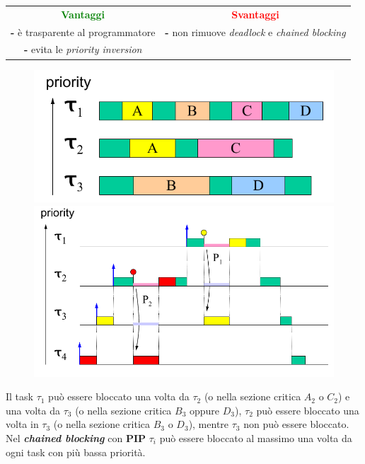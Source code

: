 \begin{center}
    \begin{tabular}{ c | c }
        \textcolor{green}{\textbf{Vantaggi}} & \textcolor{red}{\textbf{Svantaggi}} \\
        \textbf{-} è trasparente al programmatore & \textbf{-} non rimuove \textit{deadlock} e \textit{chained blocking} \\
        \textbf{-} evita le \textit{priority inversion} &  \\
    \end{tabular}
\end{center}
\begin{figure}[h]
    \centering
    \begin{minipage}[t]{0.45\textwidth}
        \centering
        \includegraphics[width=\textwidth]{img/pip_2}
    \end{minipage}
    \begin{minipage}[t]{0.45\textwidth}
        \centering
        \includegraphics[width=\textwidth]{img/pip_3}
    \end{minipage}
\end{figure}
Il task $\tau_1$ può essere bloccato una volta da $\tau_2$ (o nella sezione critica $A_2$ o $C_2$) e una volta da $\tau_3$ (o nella sezione critica $B_3$ oppure $D_3$), $\tau_2$ può essere bloccato una volta in $\tau_3$ (o nella sezione critica $B_3$ o $D_3$), mentre $\tau_3$ non può essere bloccato. \\
Nel \textbf{\textit{chained blocking}} con \textbf{PIP} $\tau_i$ può essere bloccato al massimo una volta da ogni task con più bassa priorità.
\newpage
